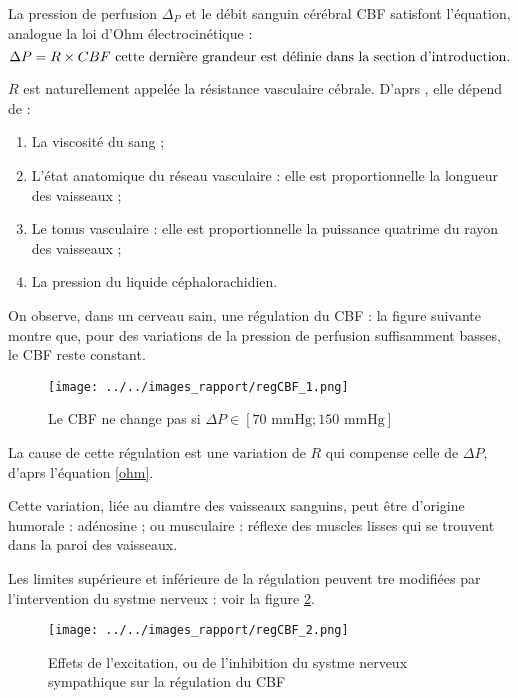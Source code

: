 \par
La pression de perfusion $\Delta_P$ et le d\'ebit sanguin c\'er\'ebral CBF satisfont l'\'equation, analogue  la loi d'Ohm \'electrocin\'etique :
\begin{equation}
\Delta P = R\times CBF%
\text{ cette derni\g{e}re grandeur est d\'efinie dans la section d'introduction.}
\label{ohm}
\end{equation}

$R$ est naturellement appel\'ee la r\'esistance vasculaire c\'ebrale. D'aprs \cite{vib_dsc}, elle d\'epend de :
\begin{enumerate}
\item La viscosit\'e du sang ;
\item L'\'etat anatomique du r\'eseau vasculaire : elle est proportionnelle  la longueur des vaisseaux ;
\item\label{reac_r_cbf} Le tonus vasculaire : elle est proportionnelle  la puissance quatrime du rayon des vaisseaux ;
\item La pression du liquide c\'ephalorachidien.
\end{enumerate}

On observe, dans un cerveau sain, une r\'egulation du CBF : %
la figure suivante montre que, pour des variations de la pression de perfusion suffisamment basses, le CBF reste constant.

\begin{figure}
\texttt{[image: ../../images\_rapport/regCBF\_1.png]}
\caption{Le CBF ne change pas si $\Delta P\in \left[70\text{ mmHg};150\text{ mmHg}\right]$}
\label{regcbf_1}
\end{figure}

La cause de cette r\'egulation est une variation de $R$ qui compense celle de $\Delta P$, d'aprs l'\'equation \ref{ohm}.

\par
Cette variation, li\'ee au diamtre des vaisseaux sanguins, peut \^etre d'origine humorale : ad\'enosine \cite{vib_dsc} ; %
ou musculaire : r\'eflexe des muscles lisses qui se trouvent dans la paroi des vaisseaux.

\par
Les limites sup\'erieure et inf\'erieure de la r\'egulation peuvent tre modifi\'ees par l'intervention du systme nerveux : voir la figure \ref{regcbf_2}.

\begin{figure}
\texttt{[image: ../../images\_rapport/regCBF\_2.png]}
\caption{Effets de l'excitation, ou de l'inhibition du systme nerveux sympathique sur la r\'egulation du CBF}
\label{regcbf_2}
\end{figure}

